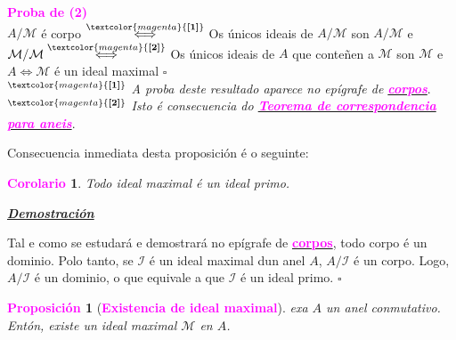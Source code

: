 \documentclass[twoside]{report}
\newcommand{\magbf}[1]{\textcolor{magenta}{\textbf{#1}}} %
\theoremstyle{mystyle}
\newtheorem{prop}{\magbf{Proposición}}[chapter]
\newtheorem{cor}{\magbf{Corolario}}[chapter]
\newenvironment{proposition}
{\begin{mdframed}[linecolor = magenta,backgroundcolor = classicrose, linewidth = 2mm]\begin{prop}}
{\end{prop}\end{mdframed}}
\newenvironment{corollary}
{\begin{mdframed}[linecolor = magenta,backgroundcolor = classicrose, linewidth = 2mm]\begin{cor}}
{\end{cor}\end{mdframed}}
\begin{document}
\vspace{3mm}

\noindent \magbf{Proba de (2)}\\

\noindent $A/\mathcal{M}$ é corpo $\overset{\magbf{[1]}}{\Longleftrightarrow}$ Os únicos ideais de $A/\mathcal{M}$ son $A/\mathcal{M}$ e $\mathcal{M}/\mathcal{M} \overset{\magbf{[2]}}{\Longleftrightarrow}$ Os únicos ideais de $A$ que conteñen a $\mathcal{M}$ son $\mathcal{M}$ e $A \Longleftrightarrow \mathcal{M}$ é un ideal maximal \hspace{2mm} $\square$ \\

\noindent $^{\magbf{[1]}}$ \textit{A proba deste resultado aparece no epígrafe de \hyperref[corpos]{\magbf{corpos}}}.\\
\noindent $^{\magbf{[2]}}$ \textit{Isto é consecuencia do \hyperref[th2.4]{\magbf{Teorema de correspondencia para aneis}}}.\\

\vspace{3mm}

\noindent Consecuencia inmediata desta proposición é o seguinte:\\

\begin{corollary} \label{cor2.1}
Todo ideal maximal é un ideal primo.
\end{corollary}

\vspace{2mm}

\noindent \textbf{\textit{\underline{Demostración}}}

\vspace{2mm}

\noindent Tal e como se estudará e demostrará no epígrafe de \hyperref[corpos]{\magbf{corpos}}, todo corpo é un dominio. Polo tanto, se $\mathcal{I}$ é un ideal maximal dun anel $A$, $A/\mathcal{I}$ é un corpo. Logo, $A/\mathcal{I}$ é un dominio, o que equivale a que $\mathcal{I}$ é un ideal primo. $\square$\\

\vspace{3mm}

\begin{proposition}[\magbf{Existencia de ideal maximal}] \label{prop2.9}
exa $A$ un anel conmutativo. Entón, existe un ideal maximal $\mathcal{M}$ en $A$.
\end{proposition}

\vspace{2mm}
\end{document}
